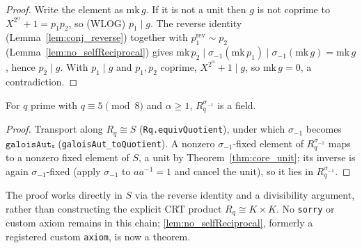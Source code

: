 \begin{proof}
\leanok{}
Write the element as $\mathrm{mk}\,g$. If it is not a unit then $g$ is not coprime to
$X^{2^\alpha}+1 = p_1 p_2$, so (WLOG) $p_1 \mid g$. The reverse identity (Lemma~\ref{lem:conj_reverse})
together with $p_1^{\mathrm{rev}} \sim p_2$ (Lemma~\ref{lem:no_selfReciprocal}) gives
$\mathrm{mk}\,p_2 \mid \sigma_{-1}(\mathrm{mk}\,p_1) \mid \sigma_{-1}(\mathrm{mk}\,g) = \mathrm{mk}\,g$,
hence $p_2 \mid g$. With $p_1 \mid g$ and $p_1, p_2$ coprime, $X^{2^\alpha}+1 \mid g$, so
$\mathrm{mk}\,g = 0$, a contradiction.
\end{proof}

\begin{theorem}\label{thm:conjFixedSubring_isField}
\leanok
{}
For $q$ prime with $q \equiv 5 \pmod 8$ and $\alpha \ge 1$, $R_q^{\sigma_{-1}}$ is a field.
\end{theorem}

\begin{proof}
\leanok{}
Transport along $R_q \cong S$ (\texttt{Rq.equivQuotient}), under which $\sigma_{-1}$ becomes
$\texttt{galoisAutₛ}$ (\texttt{galoisAut\_toQuotient}). A nonzero $\sigma_{-1}$-fixed element of
$R_q^{\sigma_{-1}}$ maps to a nonzero fixed element of $S$, a unit by
Theorem~\ref{thm:core_unit}; its inverse is again $\sigma_{-1}$-fixed (apply $\sigma_{-1}$ to
$a a^{-1} = 1$ and cancel the unit), so it lies in $R_q^{\sigma_{-1}}$.
\end{proof}

The proof works directly in $S$ via the reverse identity and a divisibility argument, rather than
constructing the explicit CRT product $R_q \cong K\times K$. No \texttt{sorry} or custom axiom
remains in this chain; \ref{lem:no_selfReciprocal}, formerly a registered custom \texttt{axiom}, is
now a theorem.
